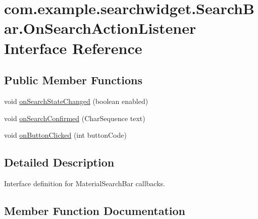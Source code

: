 \hypertarget{interfacecom_1_1example_1_1searchwidget_1_1_search_bar_1_1_on_search_action_listener}{}\section{com.\+example.\+searchwidget.\+Search\+Bar.\+On\+Search\+Action\+Listener Interface Reference}
\label{interfacecom_1_1example_1_1searchwidget_1_1_search_bar_1_1_on_search_action_listener}
\subsection*{Public Member Functions}
\begin{DoxyCompactItemize}
\item 
void \mbox{\hyperlink{interfacecom_1_1example_1_1searchwidget_1_1_search_bar_1_1_on_search_action_listener_a22a7fc0f894797efc55657f882f03af6}{on\+Search\+State\+Changed}} (boolean enabled)
\item 
void \mbox{\hyperlink{interfacecom_1_1example_1_1searchwidget_1_1_search_bar_1_1_on_search_action_listener_ad6782046ddbac0931a46b375f0e590e5}{on\+Search\+Confirmed}} (Char\+Sequence text)
\item 
void \mbox{\hyperlink{interfacecom_1_1example_1_1searchwidget_1_1_search_bar_1_1_on_search_action_listener_aece2474e59c571f0364cbe3bfffc982a}{on\+Button\+Clicked}} (int button\+Code)
\end{DoxyCompactItemize}


\subsection{Detailed Description}
Interface definition for Material\+Search\+Bar callbacks. 

\subsection{Member Function Documentation}
\mbox{\label{interfacecom_1_1example_1_1searchwidget_1_1_search_bar_1_1_on_search_action_listener_aece2474e59c571f0364cbe3bfffc982a}} 

